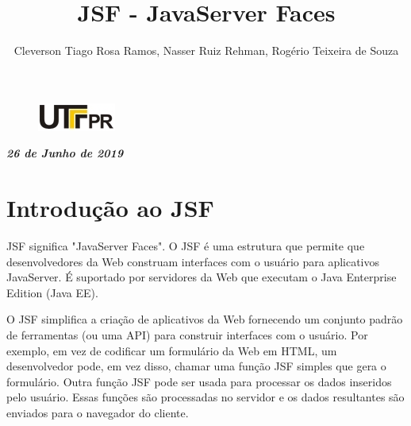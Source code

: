\documentclass[	DIV=calc,%
							paper=a4,%
							fontsize=12pt,%
							onecolumn]{scrartcl}	 					%
\title{JSF - JavaServer Faces}					%
\author{Cleverson Tiago Rosa Ramos, Nasser Ruiz Rehman, Rogério Teixeira de Souza }  	%
\date{}																				%
\newcommand{\initial}[1]{%
     \lettrine[lines=3,lhang=0.3,nindent=0em]{
     				\color{DarkGoldenrod}
     				{\textsf{#1}}}{}}
\begin{document}
\maketitle
\thispagestyle{fancy} 	
\thispagestyle{empty}		%





\begin{figure}
	\centering
	\includegraphics{utfpr}
\end{figure}

\vspace{3cm}
\centerline{\textit{\textbf{26 de Junho de 2019}}}

\clearpage
    \renewcommand*\listfigurename{Lista de figuras}
\listoffigures






\clearpage
\renewcommand{\contentsname}{Sumário}
\tableofcontents
\clearpage

\section{Introdução ao JSF}

JSF significa "JavaServer Faces". O JSF é uma estrutura que permite que desenvolvedores da Web construam interfaces com o usuário para aplicativos JavaServer. É suportado por servidores da Web que executam o Java Enterprise Edition (Java EE).

O JSF simplifica a criação de aplicativos da Web fornecendo um conjunto padrão de ferramentas (ou uma API) para construir interfaces com o usuário. Por exemplo, em vez de codificar um formulário da Web em HTML, um desenvolvedor pode, em vez disso, chamar uma função JSF simples que gera o formulário. Outra função JSF pode ser usada para processar os dados inseridos pelo usuário. Essas funções são processadas no servidor e os dados resultantes são enviados para o navegador do cliente.
\end{document}
